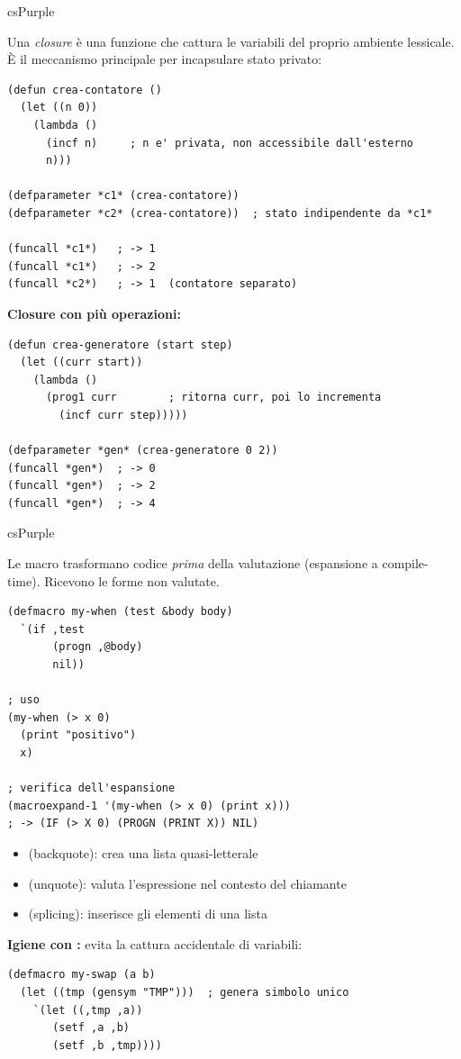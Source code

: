 \begin{refbox}[Closures]{csPurple}
\label{sec:closures}

Una \textit{closure} è una funzione che cattura le variabili del
proprio ambiente lessicale. È il meccanismo principale per
incapsulare stato privato:

\begin{lstlisting}
(defun crea-contatore ()
  (let ((n 0))
    (lambda ()
      (incf n)     ; n e' privata, non accessibile dall'esterno
      n)))

(defparameter *c1* (crea-contatore))
(defparameter *c2* (crea-contatore))  ; stato indipendente da *c1*

(funcall *c1*)   ; -> 1
(funcall *c1*)   ; -> 2
(funcall *c2*)   ; -> 1  (contatore separato)
\end{lstlisting}

\textbf{Closure con più operazioni:}\nopagebreak
\begin{lstlisting}
(defun crea-generatore (start step)
  (let ((curr start))
    (lambda ()
      (prog1 curr        ; ritorna curr, poi lo incrementa
        (incf curr step)))))

(defparameter *gen* (crea-generatore 0 2))
(funcall *gen*)  ; -> 0
(funcall *gen*)  ; -> 2
(funcall *gen*)  ; -> 4
\end{lstlisting}

\end{refbox}

\begin{refbox}[Macro]{csPurple}
\label{sec:macro}

Le macro trasformano codice \textit{prima} della valutazione
(espansione a compile-time). Ricevono le forme non valutate.

\begin{lstlisting}
(defmacro my-when (test &body body)
  `(if ,test
       (progn ,@body)
       nil))

; uso
(my-when (> x 0)
  (print "positivo")
  x)

; verifica dell'espansione
(macroexpand-1 '(my-when (> x 0) (print x)))
; -> (IF (> X 0) (PROGN (PRINT X)) NIL)
\end{lstlisting}

\begin{itemize}[leftmargin=1.5em, itemsep=2pt]
  \item {} (backquote): crea una lista quasi-letterale
  \item \fn{,} (unquote): valuta l'espressione nel contesto del chiamante
  \item {} (splicing): inserisce gli elementi di una lista
\end{itemize}

\textbf{Igiene con :} evita la cattura accidentale di variabili:\nopagebreak
\begin{lstlisting}
(defmacro my-swap (a b)
  (let ((tmp (gensym "TMP")))  ; genera simbolo unico
    `(let ((,tmp ,a))
       (setf ,a ,b)
       (setf ,b ,tmp))))
\end{lstlisting}

\end{refbox}

